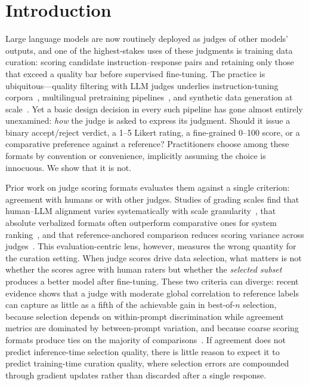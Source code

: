 
\section{Introduction}

Large language models are now routinely deployed as judges of other models'
outputs, and one of the highest-stakes uses of these judgments is training
data curation: scoring candidate instruction--response pairs and retaining
only those that exceed a quality bar before supervised fine-tuning. The
practice is ubiquitous---quality filtering with LLM judges underlies
instruction-tuning corpora~\citep{chen2024alpagasus, cui2023ultrafeedback},
multilingual pretraining pipelines~\citep{ali2025jql}, and synthetic data
generation at scale~\citep{sachdeva2024askllm}. Yet a basic design decision
in every such pipeline has gone almost entirely unexamined: \emph{how} the
judge is asked to express its judgment. Should it issue a binary
accept/reject verdict, a 1--5 Likert rating, a fine-grained 0--100 score, or
a comparative preference against a reference? Practitioners choose among
these formats by convention or convenience, implicitly assuming the choice
is innocuous. We show that it is not.

Prior work on judge scoring formats evaluates them against a single
criterion: agreement with humans or with other judges. Studies of grading
scales find that human--LLM alignment varies systematically with scale
granularity~\citep{li2025grading}, that absolute verbalized formats often
outperform comparative ones for system ranking~\citep{gera2025justrank}, and
that reference-anchored comparison reduces scoring variance across
judges~\citep{raee2026}. This evaluation-centric lens, however, measures the
wrong quantity for the curation setting. When judge scores drive data
selection, what matters is not whether the scores agree with human raters
but whether the \emph{selected subset} produces a better model after
fine-tuning. These two criteria can diverge: recent evidence shows that a
judge with moderate global correlation to reference labels can capture as
little as a fifth of the achievable gain in best-of-$n$ selection, because
selection depends on within-prompt discrimination while agreement metrics
are dominated by between-prompt variation, and because coarse scoring
formats produce ties on the majority of comparisons~\citep{landesberg2026}.
If agreement does not predict inference-time selection quality, there is
little reason to expect it to predict training-time curation quality, where
selection errors are compounded through gradient updates rather than
discarded after a single response.

